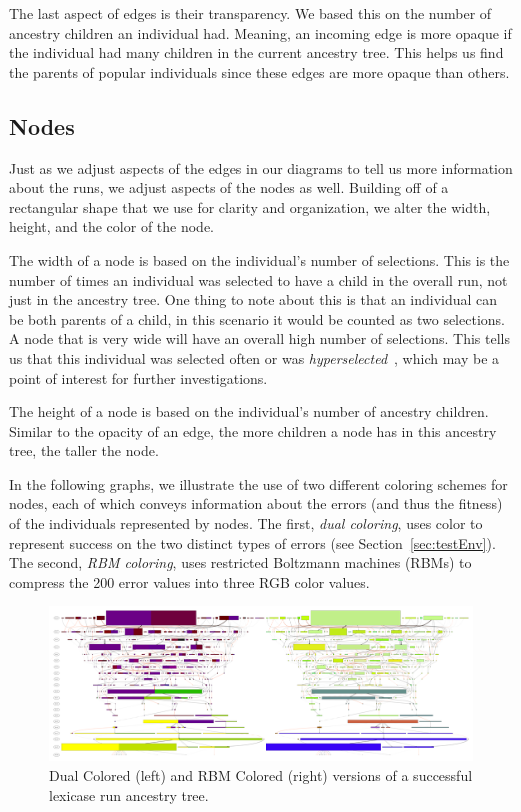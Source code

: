 \documentclass{sig-alternate}
\begin{document}
The last aspect of edges is their transparency. We based this on the number of ancestry children an individual had. Meaning, an incoming edge is more opaque if the individual had many children in the current ancestry tree. This helps us find the parents of popular individuals since these edges are more opaque than others.

\subsection{Nodes}
\label{sec:nodes}

Just as we adjust aspects of the edges in our diagrams to tell us more information about the runs, we adjust aspects of the nodes as well. Building off of a rectangular shape that we use for clarity and organization, we alter the width, height, and the color of the node.

The width of a node is based on the individual's number of selections. This is the number of times an individual was selected to have a child in the overall run, not just in the ancestry tree. One thing to note about this is that an individual can be both parents of a child, in this scenario it would be counted as two selections. A node that is very wide will have an overall high number of selections. This tells us that this individual was selected often or was \textit{hyperselected}~\cite{Helmuth:2016:GECCO}, which may be a point of interest for further investigations. 

The height of a node is based on the individual's number of ancestry children. Similar to the opacity of an edge, the more children a node has in this ancestry tree, the taller the node.

In the following graphs, we illustrate the use of two different coloring 
schemes for nodes, each of which conveys information about the errors 
(and thus the fitness) of the individuals represented by nodes. 
The first, \emph{dual coloring}, uses color to represent success on the 
two distinct types of errors (see Section~\ref{sec:testEnv}). The second,
\emph{RBM coloring}, uses restricted Boltzmann machines (RBMs) to compress
the 200 error values into three RGB color values.

\begin{figure}
	\begin{center}
		\includegraphics[width=\textwidth]{../Figures/run0_dual_and_RBM_full.pdf}
	\end{center}
	\caption{Dual Colored (left) and RBM Colored (right) versions of a successful lexicase run ancestry tree.}
	\label{fig:lexRun0DualAndRBM}
\end{figure}
\end{document}
